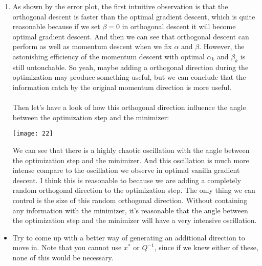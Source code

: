 \documentclass[11pt,letterpaper]{article}
\begin{document}
\begin{tcolorbox}
    \begin{enumerate}[\quad\quad]
        \item As shown by the error plot, the first intuitive observation is that the orthogonal descent is faster than the optimal gradient descent, which is quite reasonable because if we set $\beta = 0$ in orthogonal descent it will become optimal gradient descent. And then we can see that orthogonal descent can perform as well as momentum descent when we fix $\alpha$ and $\beta$. However, the astonishing efficiency of the momentum descent with optimal $\alpha_k$ and $\beta_k$ is still untouchable. So yeah, maybe adding a orthogonal direction during the optimization may produce something useful, but we can conclude that the information catch by the original momentum direction is more useful.
        \\\\
        Then let's have a look of how this orthogonal direction influence the angle between the optimization step and the minimizer:
        \begin{center}
            \texttt{[image: 22]}
        \end{center}
        We can see that there is a highly chaotic oscillation with the angle between the optimization step and the minimizer. And this oscillation is much more intense compare to the oscillation we observe in optimal vanilla gradient descent. I think this is reasonable to because we are adding a completely random orthogonal direction to the optimization step. The only thing we can control is the size of this random orthogonal direction. Without containing any information with the minimizer, it's reasonable that the angle between the optimization step and the minimizer will have a very intensive oscillation.
    \end{enumerate}
\end{tcolorbox}
\bigskip
\begin{tcolorbox}
    \begin{itemize}
        \item Try to come up with a better way of generating an additional direction to move in. Note that you cannot use $x^\ast$ or $Q^{-1}$, since if we knew either of these, none of this would be necessary.
    \end{itemize}
\end{tcolorbox}

\newpage
\end{document}
